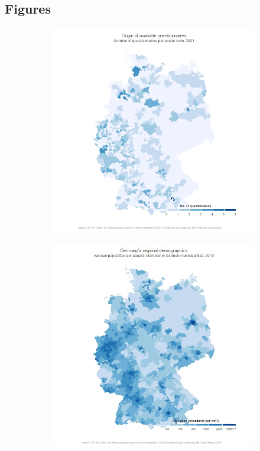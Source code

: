 \documentclass{bmcart}
\begin{document}
\begin{backmatter}
\section*{Figures}
\begin{figure}[!h]
\centering
\begin{subfigure}[b]{0.35\linewidth}
\includegraphics[width=.90\textwidth]{available.questionnaires.jpeg}
\label{fig1:questionnaires}
\end{subfigure}%
\begin{subfigure}[b]{0.35\linewidth}
\includegraphics[width=.90\textwidth]{population.perskmGER.jpeg}

\end{subfigure}
\end{figure}
\end{backmatter}
\end{document}
